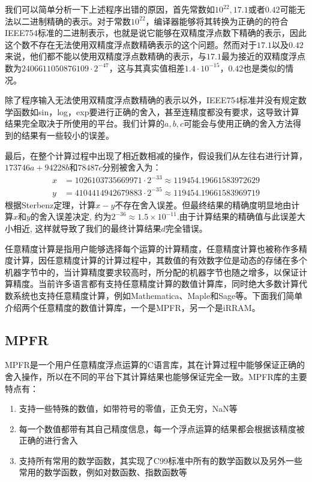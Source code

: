 我们可以简单分析一下上述程序出错的原因，首先常数如$10^{22},17.1$或者$0.42$可能无法以二进制精确的表示。对于常数$10^{22}$，编译器能够将其转换为正确的的符合IEEE754标准的二进制表示，也就是说它能够在双精度浮点数下精确的表示，因此这个数不存在无法使用双精度浮点数精确表示的这个问题。然而对于$17.1$以及$0.42$来说，他们都不能以使用双精度浮点数精确的表示，与$17.1$最为接近的双精度浮点数为$2406611050876109\cdot2^{−47}$，这与其真实值相差$1.4\cdot10^{-15}$，$0.42$也是类似的情况。

除了程序输入无法使用双精度浮点数精确的表示以外，IEEE754标准并没有规定数学函数如sin，log，exp要进行正确的舍入，甚至连精度都没有要求，这导致计算结果完全取决于所使用的平台。我们计算的$a,b,c$可能会与使用正确的舍入方法得到的结果有一些较小的误差。

最后，在整个计算过程中出现了相近数相减的操作，假设我们从左往右进行计算，$173746a+94228b$和$78487c$分别被舍入为：
\begin{align*}
x & =1026103735669971·2^{-33}≈119454.19661583972629 \\
y & =4104414942679883·2^{-35}≈119454.19661583969719
\end{align*}
根据Sterbenz定理\cite{boldo:inria-00072115}，计算$x−y$不存在舍入误差。但最终结果的精确度明显地由计算$x$和$y$的舍入误差决定, 约为$2^{-36}≈1.5 \times 10^{-11} $.由于计算结果的精确值与此误差大小相近, 这样就导致了我们的最终计算结果$d$完全错误。

任意精度计算是指用户能够选择每个运算的计算精度，任意精度计算也被称作多精度计算，因任意精度计算的计算过程中，其数值的有效数字位是动态的存储在多个机器字节中的，当计算精度要求较高时，所分配的机器字节也随之增多，以保证计算精度。当前许多语言都有支持任意精度计算的数值计算库，同时绝大多数计算代数系统也支持任意精度计算，例如Mathematica、Maple\cite{Maple10}和Sage\cite{sagemath}等。下面我们简单介绍两个任意精度的数值计算库，一个是MPFR\cite{Fousse:2007:MMB:1236463.1236468}，另一个是iRRAM\cite{10.1007/3-540-45335-0_14}。

\subsection{MPFR}

MPFR是一个用户任意精度浮点运算的C语言库，其在计算过程中能够保证正确的舍入操作，所以在不同的平台下其计算结果也能够保证完全一致。MPFR库的主要特点有：

\begin{enumerate}
\item 支持一些特殊的数值，如带符号的零值，正负无穷，NaN等
\item 每一个数值都带有其自己精度信息，每一个浮点运算的结果都会根据该精度被正确的进行舍入
\item 支持所有常用的数学函数，其实现了C99标准\cite{ISO:C99}中所有的数学函数以及另外一些常用的数学函数，例如对数函数、指数函数等
\end{enumerate}

